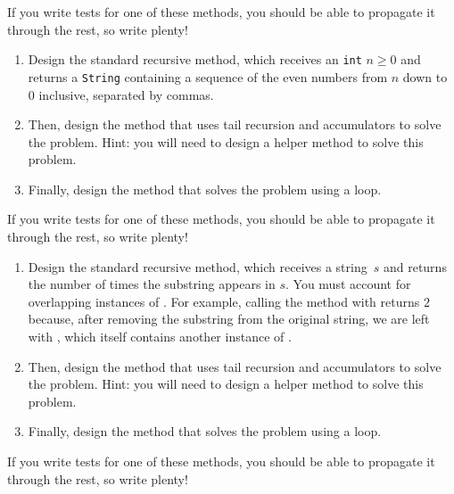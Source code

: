 If you write tests for one of these methods, you should be able to propagate it through the rest, so write plenty!

\begin{enumerate}[label=(\alph*)]
\item Design the standard recursive  method, which receives an \texttt{int} $n \geq 0$ and returns a \texttt{String} containing a sequence of the even numbers from $n$ down to $0$ inclusive, separated by commas.

\item Then, design the  method that uses tail recursion and accumulators to solve the problem. Hint: you will need to design a  helper method to solve this problem.

\item Finally, design the  method that solves the problem using a loop.
\end{enumerate}

If you write tests for one of these methods, you should be able to propagate it through the rest, so write plenty!

\begin{enumerate}[label=(\alph*)]
    \item Design the standard recursive  method, which receives a string~$s$ and returns the number of times the substring  appears in $s$. You must account for overlapping instances of . For example, calling the method with  returns $2$ because, after removing the substring  from the original string, we are left with , which itself contains another instance of .

    \item Then, design the  method that uses tail recursion and accumulators to solve the problem. Hint: you will need to design a  helper method to solve this problem.

    \item Finally, design the  method that solves the problem using a loop.
\end{enumerate}

If you write tests for one of these methods, you should be able to propagate it through the rest, so write plenty!

